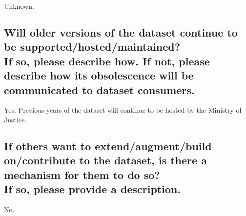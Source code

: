 \documentclass[letterpaper, 10 pt, conference]{ieeeconf}  %
\newcommand{\subtitle}[1]{{\\ \small \normalfont \color{purple} #1}}
\begin{document}
Unknown.

\subsection{Will older versions of the dataset continue to be supported/hosted/maintained? \subtitle{If so, please describe how. If not, please describe how its obsolescence will be communicated to dataset consumers. }}

Yes. Previous years of the dataset will continue to be hosted by the Ministry of Justice.

\subsection{If others want to extend/augment/build on/contribute to the dataset, is there a mechanism for them to do so? \subtitle{If so, please provide a description.}}

No.

\medskip
 
  

\end{document}
